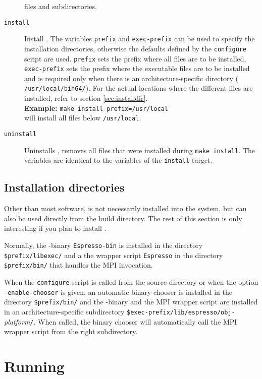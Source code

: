 \begin{description}
  files and subdirectories.
\item[\texttt{install}] Install \es. The variables \texttt{prefix} and
  \texttt{exec-prefix} can be used to specify the installation
  directories, otherwise the defaults defined by the
  \texttt{configure} script are used. \texttt{prefix} sets the prefix
  where all \es files are to be installed, \texttt{exec-prefix} sets
  the prefix where the executable files are to be installed and is
  required only when there is an architecture-specific directory (\eg
  \texttt{/usr/local/bin64/}).  For the actual locations where the
  different files are installed, refer to section
  \vref{sec:installdir}.\\
  \textbf{Example:} \verb!make install prefix=/usr/local!\\
  will install all files below \texttt{/usr/local}.
\item[\texttt{uninstall}] Uninstalls \es{}, \ie{} removes all files
  that were installed during \texttt{make install}. The variables are
  identical to the variables of the \texttt{install}-target.
\end{description}

\subsection{Installation directories}
\label{sec:installdir}

 Other than most software, \es is not
necessarily installed into the system, but can also be used directly
from the build directory.  The rest of this section is only
interesting if you plan to install \es.

Normally, the \es-binary \texttt{Espresso-bin} is installed in the
directory \texttt{\$prefix/libexec/} and a the wrapper script
\texttt{Espresso} in the directory \texttt{\$prefix/bin/} that handles
the MPI invocation.

When the \texttt{configure}-script is called from the source directory
or when the option \texttt{--enable-chooser} is given, an automatic
binary chooser is installed in the directory \texttt{\$prefix/bin/}
and the \es-binary and the MPI wrapper script are installed in an
architecture-specific subdirectory
\mbox{\texttt{\$exec-prefix/lib/espresso/obj-}\textit{platform}\texttt{/}}.
When called, the binary chooser will automatically call the MPI
wrapper script from the right subdirectory.

\section{Running \es}
\label{sec:run}

